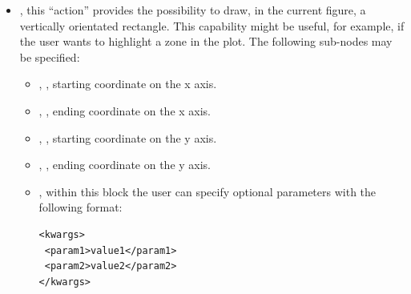 \begin{itemize}
\begin{itemize}
  The kwargs block is able to convert whatever string into a python type (for
  example \texttt{\{`1stKey':45\}} will
  be converted into a dictionary,
  \texttt{[56,67]} into a list, etc.).
    For reference regarding the available kwargs, see
    ``matplotlib.pyplot.axhspan'' method in~\cite{MatPlotLib}.
      \end{itemize}
  \nb This capability is not available for 3D plots.
  \item {}, this ``action'' provides the possibility
  to draw, in the current figure, a vertically orientated rectangle.
  This capability might be useful, for example, if the user wants to highlight a
  zone in the plot.
  The following sub-nodes may be specified:
  \begin{itemize}
    \item {}, , starting coordinate on
    the x axis.
    \item {}, , ending coordinate on the
    x axis.
    \item {}, , starting coordinate on
    the y axis.
    \item {}, , ending coordinate on the
    y axis.
    \item {}, within this block the user can specify optional
    parameters with the following format:

\begin{lstlisting}[style=XML]
<kwargs>
 <param1>value1</param1>
 <param2>value2</param2>
</kwargs>
\end{lstlisting}


\end{itemize}
\end{itemize}
